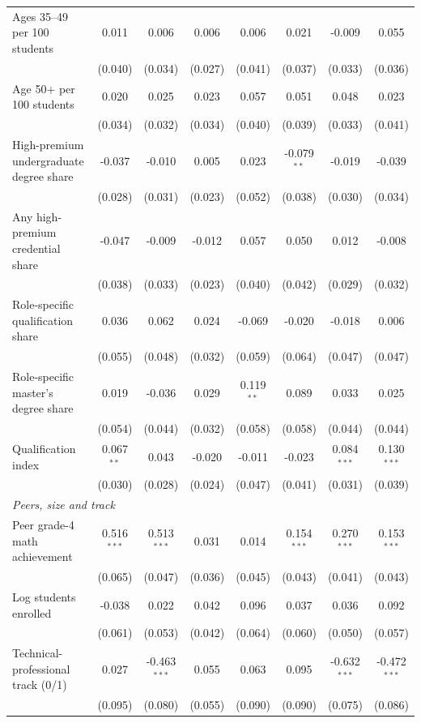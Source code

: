 \begin{table}[!htbp]
{\begin{tabular}{lccccccc}
\quad Ages 35--49 per 100 students & 0.011 & 0.006 & 0.006 & 0.006 & 0.021 & -0.009 & 0.055 \\
 & (0.040) & (0.034) & (0.027) & (0.041) & (0.037) & (0.033) & (0.036) \\
\quad Age 50+ per 100 students & 0.020 & 0.025 & 0.023 & 0.057 & 0.051 & 0.048 & 0.023 \\
 & (0.034) & (0.032) & (0.034) & (0.040) & (0.039) & (0.033) & (0.041) \\
\quad High-premium undergraduate degree share & -0.037 & -0.010 & 0.005 & 0.023 & -0.079$^{**}$ & -0.019 & -0.039 \\
 & (0.028) & (0.031) & (0.023) & (0.052) & (0.038) & (0.030) & (0.034) \\
\quad Any high-premium credential share & -0.047 & -0.009 & -0.012 & 0.057 & 0.050 & 0.012 & -0.008 \\
 & (0.038) & (0.033) & (0.023) & (0.040) & (0.042) & (0.029) & (0.032) \\
\quad Role-specific qualification share & 0.036 & 0.062 & 0.024 & -0.069 & -0.020 & -0.018 & 0.006 \\
 & (0.055) & (0.048) & (0.032) & (0.059) & (0.064) & (0.047) & (0.047) \\
\quad Role-specific master's degree share & 0.019 & -0.036 & 0.029 & 0.119$^{**}$ & 0.089 & 0.033 & 0.025 \\
 & (0.054) & (0.044) & (0.032) & (0.058) & (0.058) & (0.044) & (0.044) \\
\quad Qualification index & 0.067$^{**}$ & 0.043 & -0.020 & -0.011 & -0.023 & 0.084$^{***}$ & 0.130$^{***}$ \\
 & (0.030) & (0.028) & (0.024) & (0.047) & (0.041) & (0.031) & (0.039) \\
\multicolumn{8}{l}{\textit{Peers, size and track}} \\
\quad Peer grade-4 math achievement & 0.516$^{***}$ & 0.513$^{***}$ & 0.031 & 0.014 & 0.154$^{***}$ & 0.270$^{***}$ & 0.153$^{***}$ \\
 & (0.065) & (0.047) & (0.036) & (0.045) & (0.043) & (0.041) & (0.043) \\
\quad Log students enrolled & -0.038 & 0.022 & 0.042 & 0.096 & 0.037 & 0.036 & 0.092 \\
 & (0.061) & (0.053) & (0.042) & (0.064) & (0.060) & (0.050) & (0.057) \\
\quad Technical-professional track (0/1) & 0.027 & -0.463$^{***}$ & 0.055 & 0.063 & 0.095 & -0.632$^{***}$ & -0.472$^{***}$ \\
 & (0.095) & (0.080) & (0.055) & (0.090) & (0.090) & (0.075) & (0.086) \\

\end{tabular}}
\end{table}
